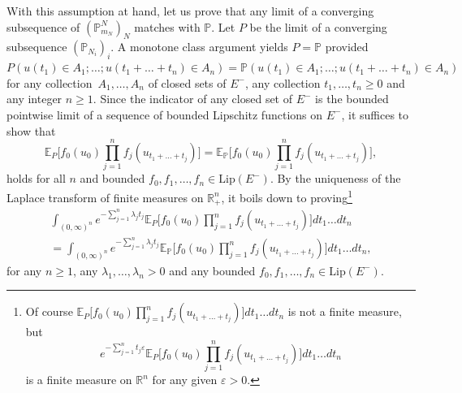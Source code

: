 \documentclass[10pt]{amsart}
\theoremstyle{definition}\newtheorem{defi}[theo]{Definition}\newtheorem{rema}[theo]{Remark}\newtheorem{exam}[theo]{Example}\newtheorem{exem}[theo]{Example}\newtheorem{nota}[theo]{Notation}
\theoremstyle{plain}
\newcommand{\bbE}{\mathbb{E}}
\newcommand{\bbP}{\mathbb{P}}
\newcommand{\bbR}{\mathbb{R}}
\newcommand{\R}{\mathbb{R}}
\newcommand*\Lip{\mathrm{Lip}}
\begin{document}
With this assumption at hand, let us prove that any limit of a converging subsequence of $(\bbP_{m_N}^{N})_N$ matches with $\bbP$. Let $P$ be the limit of a converging subsequence $(\bbP_{N_i})_i$. A monotone class argument yields $P=\bbP$ provided $P(u(t_1)\in A_1;\dots;u(t_1+\dots+t_n)\in A_n)=\bbP(u(t_1)\in A_1;\dots;u(t_1+\dots +t_n)\in A_n)$ for any collection~$A_1,\dots,A_n$ of closed sets of $E^-$, any collection $t_1,\dots,t_n \ge 0$ and any integer $n\ge 1$. Since the indicator of any closed set of $E^-$ is the bounded pointwise limit of a sequence of bounded Lipschitz functions on $E^-$, it suffices to show that
\begin{equation}
\bbE_P\Big[f_0(u_0)\prod_{j=1}^n f_j(u_{t_1+\dots+t_j})\Big] = \bbE_\bbP\Big[f_0(u_0)\prod_{j=1}^n f_j(u_{t_1+\dots+t_j})\Big],
\end{equation}
holds for all $n$ and bounded $f_0, f_1,\dots, f_n\in\Lip(E^-)$. By the uniqueness of the Laplace transform of finite measures on $\bbR^n_+$, it boils down to proving\footnote{ Of course $\bbE_P\Big[f_0(u_0)\prod_{j=1}^n f_j(u_{t_1+\dots+t_j})\Big] dt_1\dots dt_n$ is not a finite measure, but
\[
e^{-\sum_{j=1}^n t_j \varepsilon} \bbE_P\Big[f_0(u_0)\prod_{j=1}^n f_j(u_{t_1+\dots+t_j})\Big] dt_1\dots dt_n
\]
is a finite measure on $\R^n$ for any given $\varepsilon > 0$.}
\begin{multline}\label{Eq:IdResolvents}
\int_{(0,\infty)^n} e^{-\sum_{j=1}^n \lambda_j t_j} \bbE_P\Big[f_0(u_0)\prod_{j=1}^n f_j(u_{t_1+\dots+t_j})\Big] dt_1\dots dt_n\\
= \int_{(0,\infty)^n} e^{-\sum_{j=1}^n \lambda_j t_j} \bbE_\bbP\Big[f_0(u_0)\prod_{j=1}^n f_j(u_{t_1+\dots+t_j})\Big] dt_1\dots dt_n ,
\end{multline}
for any $n\geq 1$, any $\lambda_1,\dots,\lambda_n > 0$ and any bounded $f_0, f_1,\dots, f_n \in \Lip(E^{-})$.
\end{document}
